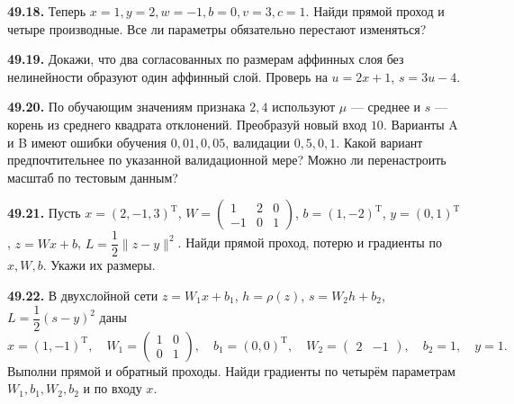 \noindent\begin{minipage}[t]{\linewidth}\textbf{49.18.} Теперь \(x=1,y=2,w=-1,b=0,v=3,c=1\). Найди прямой проход и четыре производные. Все ли параметры обязательно перестают изменяться?\par\end{minipage}\par
\noindent\begin{minipage}[t]{\linewidth}\textbf{49.19.}\starmark{} Докажи, что два согласованных по размерам аффинных слоя без нелинейности образуют один аффинный слой. Проверь на \(u=2x+1\), \(s=3u-4\).\par\end{minipage}\par
\noindent\begin{minipage}[t]{\linewidth}\textbf{49.20.} По обучающим значениям признака \(2,4\) используют \(\mu\) --- среднее и \(s\) --- корень из среднего квадрата отклонений. Преобразуй новый вход \(10\). Варианты A и B имеют ошибки обучения \(0{,}01,0{,}05\), валидации \(0{,}5,0{,}1\). Какой вариант предпочтительнее по указанной валидационной мере? Можно ли перенастроить масштаб по тестовым данным?\par\end{minipage}\par
\noindent\begin{minipage}[t]{\linewidth}\textbf{49.21.} Пусть \(x=(2,-1,3)^{\mathrm T}\), \(W=\begin{pmatrix}1&2&0\\-1&0&1\end{pmatrix}\), \(b=(1,-2)^{\mathrm T}\), \(y=(0,1)^{\mathrm T}\), \(z=Wx+b\), \(L=\dfrac{1}{2}\|z-y\|^2\). Найди прямой проход, потерю и градиенты по \(x,W,b\). Укажи их размеры.\par\end{minipage}\par
\noindent\begin{minipage}[t]{\linewidth}\textbf{49.22.}\starmark{} В двухслойной сети \(z=W_1x+b_1\), \(h=\rho(z)\), \(s=W_2h+b_2\), \(L=\dfrac{1}{2}(s-y)^2\) даны
\[
 x=(1,-1)^{\mathrm T},\quad W_1=\begin{pmatrix}1&0\\0&1\end{pmatrix},\quad
 b_1=(0,0)^{\mathrm T},\quad W_2=\begin{pmatrix}2&-1\end{pmatrix},\quad b_2=1,\quad y=1.
\]
Выполни прямой и обратный проходы. Найди градиенты по четырём параметрам \(W_1,b_1,W_2,b_2\) и по входу \(x\).\par\end{minipage}\par
\endgroup
